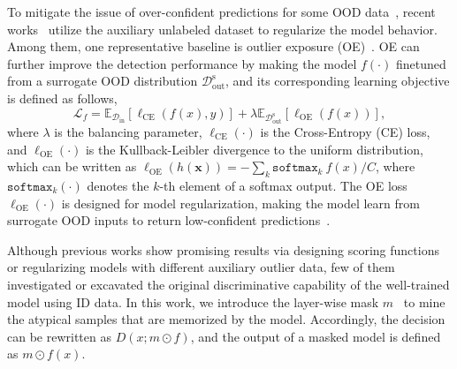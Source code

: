 \documentclass{article}
\theoremstyle{plain}
\theoremstyle{definition}
\theoremstyle{remark}
\begin{document}
To mitigate the issue of over-confident predictions for some OOD data~\citep{hendrycks17baseline,liu2020energy},  recent works~\citep{hendrycks2018deep, Tack20CSI} utilize the auxiliary unlabeled dataset to regularize the model behavior. Among them, one representative baseline is outlier exposure (OE)~\citep{hendrycks2018deep}. OE can further improve the detection performance by making the model $f(\cdot)$ finetuned from a surrogate OOD distribution $\mathcal{D}^\text{s}_\text{out}$, and its corresponding learning objective is defined as follows,
\begin{equation}
    {\mathcal{L}}_f=\mathbb{E}_{\mathcal{D}_\text{in}}\left[\ell_\text{CE}(f(x),y)\right]
     + \lambda \mathbb{E}_{\mathcal{D}^\text{s}_\text{out}}\left[\ell_\text{OE}(f(x))\right], \label{eq: oe}
\end{equation}
where $\lambda$ is the balancing parameter,  $\ell_\text{CE}(\cdot)$ is the Cross-Entropy (CE) loss, and $\ell_\text{OE}(\cdot)$ is the Kullback-Leibler divergence to the uniform distribution, which can be written as $\ell_\text{OE}(h(\boldsymbol{x}))=-\sum_k \texttt{softmax}_k~f(x) / C$, where $\texttt{softmax}_k (\cdot)$ denotes the $k$-th element of a softmax output. The OE loss $\ell_\text{OE}(\cdot)$ is designed for model regularization, making the model learn from surrogate OOD inputs to return low-confident predictions~\citep{hendrycks2018deep}. 


Although previous works show promising results via designing scoring functions or regularizing models with different auxiliary outlier data, few of them investigated or excavated the original discriminative capability of the well-trained model using ID data. In this work, we introduce the layer-wise mask $m$~\citep{han2015deep,ramanujan2020s} to mine the atypical samples that are memorized by the model. Accordingly, the decision can be rewritten as $D(x;m\odot f)$, and the output of a masked model is defined as $m\odot f(x)$. 
\end{document}
